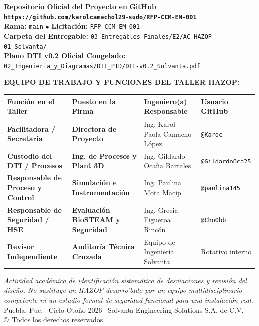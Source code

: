 \documentclass[10pt,letterpaper]{article}
\begin{document}
\begin{titlepage}
    \begin{tcolorbox}[colframe=navyblue,colback=white,arc=2mm,boxrule=0.8pt]
        \centering
        \textbf{\color{navyblue}\large Repositorio Oficial del Proyecto en GitHub}\\[2pt]
        \href{https://github.com/karolcamachol29-sudo/RFP-CCM-EM-001}{\texttt{\textbf{https://github.com/karolcamachol29-sudo/RFP-CCM-EM-001}}}\\[3pt]
        \footnotesize
        \textbf{Rama:} \texttt{main} \quad $\bullet$ \quad \textbf{Licitación:} \texttt{RFP-CCM-EM-001}\\[1pt]
        \textbf{Carpeta del Entregable:} \texttt{03\_Entregables\_Finales/E2/AC-HAZOP-01\_Solvanta/}\\
        \textbf{Plano DTI v0.2 Oficial Congelado:} \texttt{02\_Ingenieria\_y\_Diagramas/DTI\_PID/DTI-v0.2\_Solvanta.pdf}
    \end{tcolorbox}
    \vspace{0.25cm}
    \textbf{\large EQUIPO DE TRABAJO Y FUNCIONES DEL TALLER HAZOP:}\\[0.15cm]
    \begin{center}
    \footnotesize
    \setlength{\tabcolsep}{5pt}
    \begin{tabularx}{\textwidth}{>{\bfseries}p{4.2cm} >{\bfseries}p{3.5cm} X >{\centering\arraybackslash}p{2.6cm}}
        \toprule
        \textbf{Función en el Taller} & \textbf{Puesto en la Firma} & \textbf{Ingeniero(a) Responsable} & \textbf{Usuario GitHub} \\
        \midrule
        Facilitadora / Secretaria & Directora de Proyecto & Ing. Karol Paola Camacho López & \texttt{@Karoc} \\
        Custodio del DTI / Procesos & Ing. de Procesos y Plant 3D & Ing. Gildardo Ocaña Barrales & \texttt{@GildardoOca25} \\
        Responsable de Proceso y Control & Simulación e Instrumentación & Ing. Paulina Mota Macip & \texttt{@paulina145} \\
        Responsable de Seguridad / HSE & Evaluación BioSTEAM y Seguridad & Ing. Grecia Figueroa Rincón & \texttt{@Cho0bb} \\
        Revisor Independiente & Auditoría Técnica Cruzada & Equipo de Ingeniería Solvanta & Rotativo interno \\
        \bottomrule
    \end{tabularx}
    \end{center}
    \vfill
    {\footnotesize \textit{Actividad académica de identificación sistemática de desviaciones y revisión del diseño. No sustituye un HAZOP desarrollado por un equipo multidisciplinario competente ni un estudio formal de seguridad funcional para una instalación real.}\\
    Puebla, Pue. \textbar\ Ciclo Otoño 2026 \textbar\ Solvanta Engineering Solutions S.A. de C.V. \copyright\ Todos los derechos reservados.}
\end{titlepage}
\end{document}
